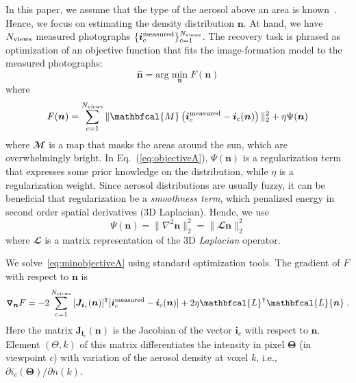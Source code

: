 \documentclass[10pt,letterpaper]{article}
\newcommand{\Mask}{\mathbfcal{M}}
\newcommand{\Laplacian}{\mathbfcal{L}}
\newcommand{\Grad}[1]{\bm{\triangledown_{#1}}}
\newcommand{\argmin}{\mathrm{arg}\min}
\newcommand{\roundy}[1]{\left(#1\right)}
\newcommand{\vect}[1]{\bm{#1}}
\newcommand{\transpose}[1]{{#1}^\intercal}
\begin{document}
In this paper, we assume that the type of the aerosol above an area is known~\cite{Martonchik2009}. Hence, we focus on estimating the density distribution ${\bm n}$.
At hand, we have $N_{\rm views}$ measured photographs
 $\{ {\bm i}^{\rm measured}_c\}_{c=1}^{N_{\rm views}}$. The recovery task is phrased as
optimization of an objective function that fits the image-formation model to the measured photographs:
\begin{equation}
  \label{eq:minobjectiveA}
  \hat{\bm n} =
  \argmin_{{\bm n}} F({\bm n})
\end{equation}
where
\begin{equation}
  \label{eq:objectiveA}
  F({\bm n})
  = \sum_{c=1}^{N_{\rm views}}
  \| \Mask \roundy{{\bm i}^{\rm measured}_c - {\bm i}_c({\bm n})}\|^2_2
  + \eta \Psi({\bm n})
\end{equation}
where $\Mask$ is a map that masks the areas around
the sun, which are overwhelmingly bright. %
In Eq.~(\ref{eq:objectiveA}), $\Psi({\bm n})$ is a regularization term that expresses some prior knowledge on the distribution, while $\eta$ is a regularization weight.  Since aerosol distributions are usually fuzzy,
it can be beneficial that regularization be a {\em smoothness term}, which penalized energy in second order spatial derivatives (3D Laplacian). Hende, we use
\begin{equation}
  \label{eq:regularizer}
  \Psi({\bm n}) = \| \nabla^2{\bm n}\|^2_2 = \| \Laplacian{\bm n}\|^2_2
\end{equation}
where $\Laplacian$ is a matrix representation of the 3D \emph{Laplacian}
operator.

We solve~\cref{eq:minobjectiveA} using standard optimization tools.
The gradient of $F$ with respect to ${\bm n}$ is
\begin{align}
  \Grad{{\bm n}} F = -2\sum_{c=1}^{N_{\rm views}}
  \transpose{\left[{\bm J}_{{\bm i}_c}({\bm n})\right]} [{\bm i}^{\rm
    measured}_c - {\bm i}_c({\bm n})] + 2 \eta \transpose{\Laplacian}\Laplacian{\bm n} \;.
  \label{eq:gradient1}
\end{align}
Here the matrix ${\bm J}_{{\bm i}_c}({\bm n})$ is the Jacobian of the
vector ${\bm i}_c$ with respect to ${\bm n}$.  Element $(\Theta,k)$ of
this matrix differentiates the intensity in pixel ${\bm \Theta}$ (in
viewpoint $c$) with variation of the aerosol density at voxel $k$, i.e.,
$\partial i_c({\bm \Theta})/\partial{n(k)}$.
\end{document}
